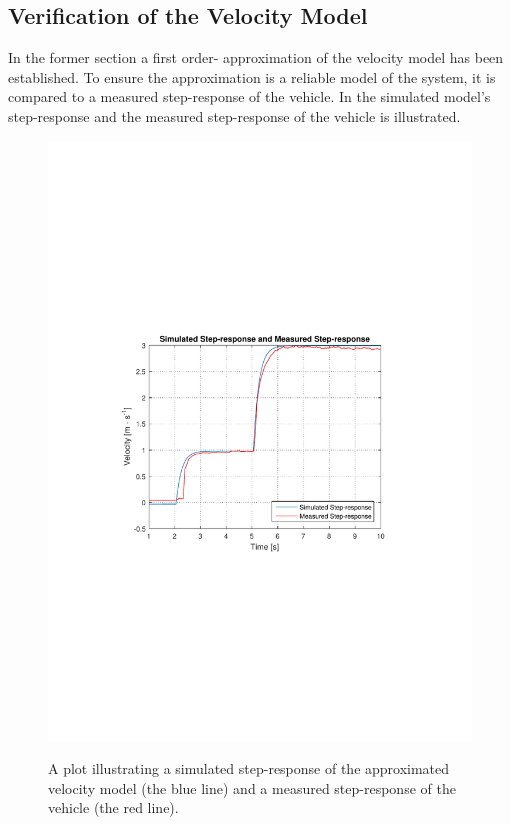 \subsection{Verification of the Velocity Model}
In the former section a first order- approximation of the velocity model has been established. To ensure the approximation is a reliable model of the system, it is compared to a measured step-response of the vehicle. In  the simulated model's step-response and the measured step-response of the vehicle is illustrated. 
%
\begin{figure}[H]
  \centering
  {
    \includegraphics[width=1.4\textwidth]{figures/SimulationIRLsteprespons2.pdf}
  }
  \caption{A plot illustrating a simulated step-response of the approximated velocity model (the blue line) and a measured step-response of the vehicle (the red line).}
  \label{SimulationIRLsteprespons2}
\end{figure}

